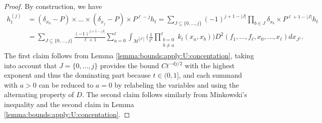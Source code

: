 \documentclass[10pt]{article}
\theoremstyle{plain}
\theoremstyle{definition}
\theoremstyle{remark}
\begin{document}
\begin{proof}
    By construction, we have 
    \begin{align*}
        h_t^{(j)}&=(\delta_{x_0}-P)\times \dots\times (\delta_{x_j}-P) \times P^{\ell-j} h_t=\sum_{J\subseteq \{0,\dots,j\}}(-1)^{j+1-|J|}\prod_{b\in J}\delta_{x_b}\times P^{\ell+1-|J|}h_t\\
        &=\sum_{J\subseteq \{0,\dots,j\}}\frac{(-1)^{j+1-|J|}}{\ell+1}\sum_{a=0}^\ell \int_{\mathcal{M}^{|J^\complement|}}\Big(\frac{1}{t^\ell}\prod_{\substack{b=0\\ b\neq a}}^\ell k_t(x_a,x_b)\Big) D^2(f_1,\dots,f_\ell,x_0,\dots,x_\ell)dx_{J^\complement}.
    \end{align*}
    The first claim follows from Lemma \ref{lemma:bounds:apply:U:concentation}, taking into account that $J=\{0,\dots,j\}$ provides the bound $Ct^{-dj/2}$ with the highest exponent and thus the dominating part because $t\in(0,1]$, and each summand with $a>0$ can be reduced to $a=0$ by relabeling the variables and using the alternating property of $D$. The second claim follows similarly from Minkowski's inequality and the second claim in Lemma \ref{lemma:bounds:apply:U:concentation}.    
\end{proof}
\end{document}
